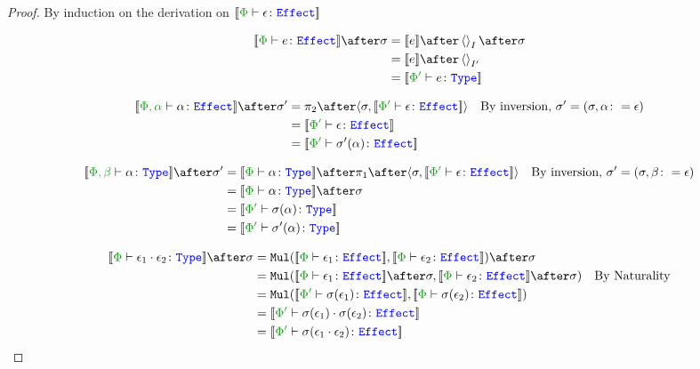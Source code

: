 \documentclass{report}
\begin{document}
\begin{framed}
    \begin{proof}
        By induction on the derivation on $\deno{\typerelation{\P}{\e}{\effect}}$
        
        \begin{align*}
            \deno{\typerelation{\P}{e}{\effect}}\after\si & = \deno{e}\after\term{I}\after\si \\
            & = \deno{e}\after\term{I'} \\
            & = \deno{\typerelation{\P'}{e}{\type}}\\
        \end{align*}
        
        \begin{align*}
            \deno{\typerelation{\P,\a}{\a}{\effect}}\after\si' &= \pp\after\pr{\si}{\deno{\typerelation{\P'}{\e}{\effect}}}\qt{By inversion, $\si' = (\si, \a\setto\e)$}\\
            & =\deno{\typerelation{\P'}{\e}{\effect}} \\
            &= \deno{\typerelation{\P'}{\si'(\a)}{\effect}}\\
        \end{align*}
        
        \begin{align*}
            \deno{\typerelation{\P, \b}{\a}{\type}}\after\si' &= \deno{\typerelation{\P}{\a}{\type}} \after \p\after\pr{\si}{\deno{\typerelation{\P'}{\e}{\effect}}}\qt{By inversion, $\si' = (\si, \b\setto\e)$}\\
            & = \deno{\typerelation{\P}{\a}{\type}}\after\si\\
            & = \deno{\typerelation{\P'}{\si(\a)}{\type}}\\
            & = \deno{\typerelation{\P'}{\si'(\a)}{\type}}\\
        \end{align*}
        
        \begin{align*}
            \deno{\typerelation{\P}{\e_1\dot\e_2}{\type}} \after\si &=
            \Mul(\deno{\typerelation{\P}{\e_1}{\effect}}, \deno{\typerelation{\P}{\e_2}{\effect}})\after \si \\
            & = \Mul(\deno{\typerelation{\P}{\e_1}{\effect}}\after \si, \deno{\typerelation{\P}{\e_2}{\effect}}\after \si)\qt{By Naturality}\\
            & = \Mul(\deno{\typerelation{\P'}{\si(\e_1)}{\effect}}, \deno{\typerelation{\P}{\si(\e_2)}{\effect}})\\
            & = \deno{\typerelation{\P'}{\si(\e_1)\dot\si(\e_2)}{\effect}}\\
            & = \deno{\typerelation{\P'}{\si(\e_1\dot\e_2)}{\effect}}\\
        \end{align*}
        

\end{proof}
\end{framed}
\end{document}
